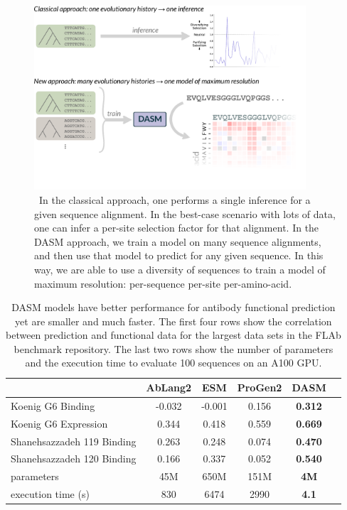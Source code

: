 \documentclass{article}
\begin{document}
\begin{figure}[h!]
\centering
\centerline{\includegraphics[width=0.9\textwidth]{figures/dasm-paradigm}}
\caption{\
In the classical approach, one performs a single inference for a given sequence alignment. 
In the best-case scenario with lots of data, one can infer a per-site selection factor for that alignment.
In the DASM approach, we train a model on many sequence alignments, and then use that model to predict for any given sequence.
In this way, we are able to use a diversity of sequences to train a model of maximum resolution: per-sequence per-site per-amino-acid.
}%
\label{fig:methods}
\end{figure}

\begin{table}[ht]
  \begin{center}
  \begin{tabular}{lccccc}
  & AbLang2 & ESM & ProGen2 & DASM \\
  \midrule
  Koenig G6 Binding & -0.032 & -0.001 & 0.156 & \textbf{0.312} \\
  Koenig G6 Expression & 0.344 & 0.418 & 0.559 & \textbf{0.669} \\
  Shanehsazzadeh 119 Binding & 0.263 & 0.248 & 0.074 & \textbf{0.470} \\
  Shanehsazzadeh 120 Binding & 0.166 & 0.337 & 0.052 & \textbf{0.540} \\
  \bottomrule
  parameters & 45M  & 650M & 151M & \textbf{4M} \\
  execution time (s) & 830 & 6474 & 2990 & \textbf{4.1} \\
  \bottomrule
  \end{tabular}
\end{center}
  \caption{%
  DASM models have better performance for antibody functional prediction yet are smaller and much faster.
  The first four rows show the correlation between prediction and functional data for the largest data sets in the FLAb benchmark repository.
  The last two rows show the number of parameters and the execution time to evaluate 100 sequences on an A100 GPU.
  }
  \label{tab:model-comparison}
\end{table}
\end{document}
